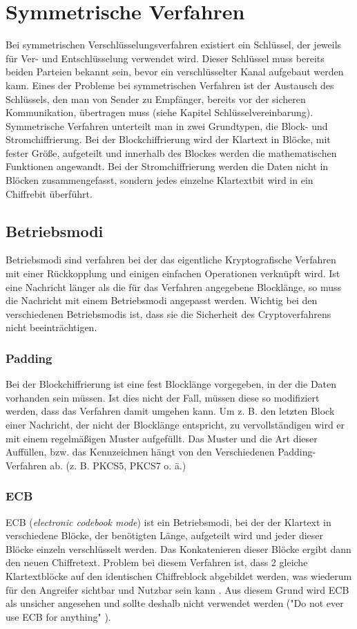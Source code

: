 \documentclass[10pt, a4paper,headsepline]{scrreprt}
\begin{document}
\section{Symmetrische Verfahren}
Bei symmetrischen Verschlüsselungsverfahren existiert ein Schlüssel, der jeweils für Ver- und Entschlüsselung verwendet wird. Dieser Schlüssel muss bereits beiden Parteien bekannt sein, bevor ein verschlüsselter Kanal aufgebaut werden kann. Eines der Probleme bei symmetrischen Verfahren ist der Austausch des Schlüssels, den man von Sender zu Empfänger, bereits vor der sicheren Kommunikation, übertragen muss (siehe Kapitel Schlüsselvereinbarung). Symmetrische Verfahren unterteilt man in zwei Grundtypen, die Block- und Stromchiffrierung. Bei der Blockchiffrierung wird der Klartext in Blöcke, mit fester Größe, aufgeteilt und innerhalb des Blockes werden die mathematischen Funktionen angewandt. Bei der Stromchiffrierung werden die Daten nicht in Blöcken zusammengefasst, sondern jedes einzelne Klartextbit wird in ein Chiffrebit überführt. \citep[S. 223]{book:angewandte-krypto}

\subsection{Betriebsmodi}
Betriebsmodi sind verfahren bei der das eigentliche Kryptografische Verfahren mit einer Rückkopplung und einigen einfachen Operationen verknüpft wird. Ist eine Nachricht länger als die für das Verfahren angegebene Blocklänge, so muss die Nachricht mit einem Betriebsmodi angepasst werden. Wichtig bei den verschiedenen Betriebsmodis ist, dass sie die Sicherheit des Cryptoverfahrens nicht beeinträchtigen.

\subsubsection{Padding}
Bei der Blockchiffrierung ist eine fest Blocklänge vorgegeben, in der die Daten vorhanden sein müssen. Ist dies nicht der Fall, müssen diese so modifiziert werden, dass das Verfahren damit umgehen kann.
Um z. B. den letzten Block einer Nachricht, der nicht der Blocklänge entspricht, zu vervollständigen wird er mit einem regelmäßigen Muster aufgefüllt. Das Muster und die Art dieser Auffüllen, bzw. das Kennzeichnen hängt von den Verschiedenen Padding-Verfahren ab. (z. B. PKCS5, PKCS7 o. ä.)

\subsubsection{ECB}
ECB (\textit{electronic codebook mode}) ist ein Betriebsmodi, bei der der Klartext in verschiedene Blöcke, der benötigten Länge, aufgeteilt wird und jeder dieser Blöcke einzeln verschlüsselt werden. Das Konkatenieren dieser Blöcke ergibt dann den neuen Chiffretext. Problem bei diesem Verfahren ist, dass 2 gleiche Klartextblöcke auf den identischen Chiffreblock abgebildet werden, was wiederum für den Angreifer sichtbar und Nutzbar sein kann \citep[S. 223ff]{book:angewandte-krypto}. Aus diesem Grund wird ECB als unsicher angesehen und sollte deshalb nicht verwendet werden ("Do not ever use ECB for anything" \citep[S. 69]{book:practical-crypto}).
\end{document}
